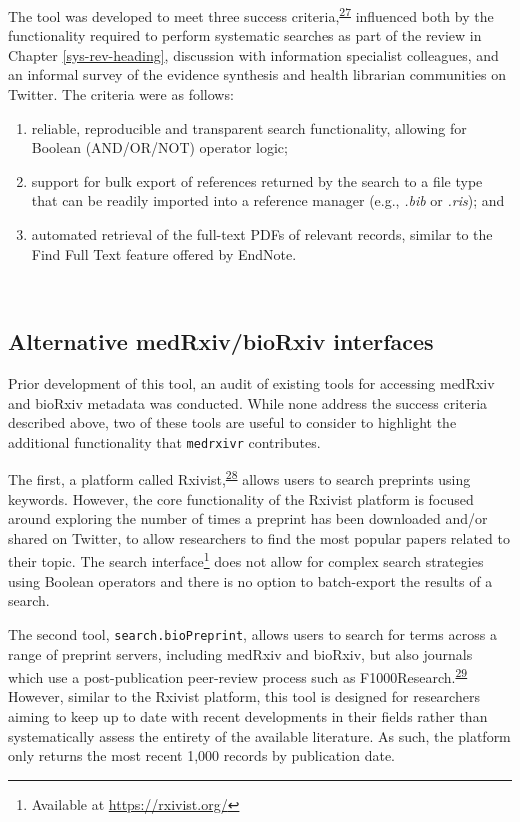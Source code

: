 \documentclass[a4paper, twoside]{templates/ociamthesis}
\begin{document}
The tool was developed to meet three success criteria,\textsuperscript{\protect\hyperlink{ref-wateridge1995}{27}} influenced both by the functionality required to perform systematic searches as part of the review in Chapter \ref{sys-rev-heading}, discussion with information specialist colleagues, and an informal survey of the evidence synthesis and health librarian communities on Twitter. The criteria were as follows:

\begin{enumerate}
\def\labelenumi{\arabic{enumi}.}
\item
  reliable, reproducible and transparent search functionality, allowing for Boolean (AND/OR/NOT) operator logic;
\item
  support for bulk export of references returned by the search to a file type that can be readily imported into a reference manager (e.g., \emph{.bib} or \emph{.ris}); and
\item
  automated retrieval of the full-text PDFs of relevant records, similar to the Find Full Text feature offered by EndNote.
\end{enumerate}

~

\hypertarget{alternative-medrxivbiorxiv-interfaces}{%
\subsection{Alternative medRxiv/bioRxiv interfaces}\label{alternative-medrxivbiorxiv-interfaces}}

Prior development of this tool, an audit of existing tools for accessing medRxiv and bioRxiv metadata was conducted. While none address the success criteria described above, two of these tools are useful to consider to highlight the additional functionality that \texttt{medrxivr} contributes.

The first, a platform called Rxivist,\textsuperscript{\protect\hyperlink{ref-abdill2019}{28}} allows users to search preprints using keywords. However, the core functionality of the Rxivist platform is focused around exploring the number of times a preprint has been downloaded and/or shared on Twitter, to allow researchers to find the most popular papers related to their topic. The search interface\footnote{Available at \url{https://rxivist.org/}} does not allow for complex search strategies using Boolean operators and there is no option to batch-export the results of a search.

The second tool, \texttt{search.bioPreprint}, allows users to search for terms across a range of preprint servers, including medRxiv and bioRxiv, but also journals which use a post-publication peer-review process such as F1000Research.\textsuperscript{\protect\hyperlink{ref-iwema2016}{29}} However, similar to the Rxivist platform, this tool is designed for researchers aiming to keep up to date with recent developments in their fields rather than systematically assess the entirety of the available literature. As such, the platform only returns the most recent 1,000 records by publication date.
\end{document}

